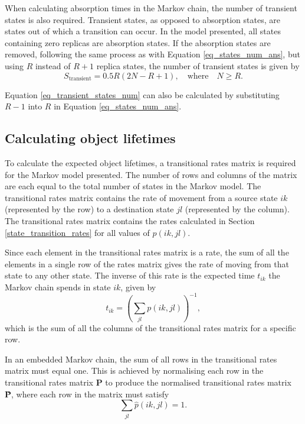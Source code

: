 \documentclass[10pt,a4paper,conference]{IEEEtran}
\begin{document}
When calculating absorption times in the Markov chain, the number of transient states is also required. Transient states, as opposed to absorption states, are states out of which a transition can occur. In the model presented, all states containing zero replicas are absorption states. If the absorption states are removed, following the same process as with Equation \eqref{eq_states_num_ans}, but using $R$ instead of $R+1$ replica states, the number of transient states is given by
%
\begin{equation}
S_\textrm{transient} = 0.5 R (2 N - R + 1), \quad\textrm{where}\quad N \geq R. \label{eq_transient_states_num}
\end{equation}

Equation \eqref{eq_transient_states_num} can also be calculated by substituting $R-1$ into $R$ in Equation \eqref{eq_states_num_ans}.

\subsection{Calculating object lifetimes}

To calculate the expected object lifetimes, a transitional rates matrix is required for the Markov model presented. The number of rows and columns of the matrix are each equal to the total number of states in the Markov model. The transitional rates matrix contains the rate of movement from a source state $ik$ (represented by the row) to a destination state $jl$ (represented by the column). The transitional rates matrix contains the rates calculated in Section \ref{state_transition_rates} for all values of $p(ik, jl)$.

Since each element in the transitional rates matrix is a rate, the sum of all the elements in a single row of the rates matrix gives the rate of moving from that state to any other state. The inverse of this rate is the expected time $t_{ik}$ the Markov chain spends in state $ik$, given by
%
\begin{equation} \label{eq_markov_rates}
    t_{ik} = \left(\sum_{jl} p(ik, jl)\right)^{-1},
\end{equation}
%
which is the sum of all the columns of the transitional rates matrix for a specific row.

In an embedded Markov chain, the sum of all rows in the transitional rates matrix must equal one. This is achieved by normalising each row in the transitional rates matrix \textbf{P} to produce the normalised transitional rates matrix \textbf{\^{P}}, where each row in the matrix must satisfy
%
\begin{equation} \label{eq_markov_sum}
    \sum_{jl} \hat{p}(ik, jl) = 1.
\end{equation}
\end{document}
